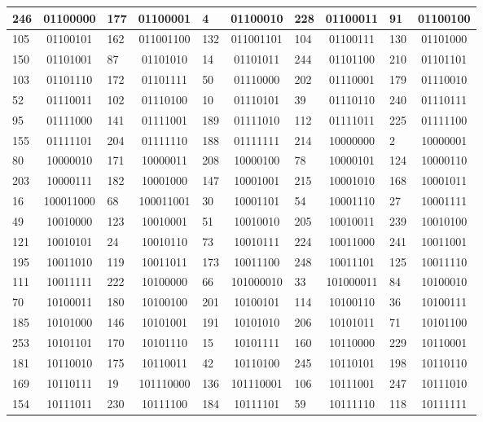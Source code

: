 \documentclass[conference,onecolumn,12pt]{IEEEtran}
\numberwithin{equation}{subsection}
\begin{document}
\begin{table}[h]
\begin{tabular}{l c l c l c l c l c}
246 & 01100000 & 177 & 01100001 & 4 & 01100010 & 228 & 01100011 & 91 & 01100100 \\ \hline
105 & 01100101 & 162 & 011001100 & 132 & 011001101 & 104 & 01100111 & 130 & 01101000 \\ \hline
150 & 01101001 & 87 & 01101010 & 14 & 01101011 & 244 & 01101100 & 210 & 01101101 \\ \hline
103 & 01101110 & 172 & 01101111 & 50 & 01110000 & 202 & 01110001 & 179 & 01110010 \\ \hline
52 & 01110011 & 102 & 01110100 & 10 & 01110101 & 39 & 01110110 & 240 & 01110111 \\ \hline
95 & 01111000 & 141 & 01111001 & 189 & 01111010 & 112 & 01111011 & 225 & 01111100 \\ \hline
155 & 01111101 & 204 & 01111110 & 188 & 01111111 & 214 & 10000000 & 2 & 10000001 \\ \hline
80 & 10000010 & 171 & 10000011 & 208 & 10000100 & 78 & 10000101 & 124 & 10000110 \\ \hline
203 & 10000111 & 182 & 10001000 & 147 & 10001001 & 215 & 10001010 & 168 & 10001011 \\ \hline
16 & 100011000 & 68 & 100011001 & 30 & 10001101 & 54 & 10001110 & 27 & 10001111 \\ \hline
49 & 10010000 & 123 & 10010001 & 51 & 10010010 & 205 & 10010011 & 239 & 10010100 \\ \hline
121 & 10010101 & 24 & 10010110 & 73 & 10010111 & 224 & 10011000 & 241 & 10011001 \\ \hline
195 & 10011010 & 119 & 10011011 & 173 & 10011100 & 248 & 10011101 & 125 & 10011110 \\ \hline
111 & 10011111 & 222 & 10100000 & 66 & 101000010 & 33 & 101000011 & 84 & 10100010 \\ \hline
70 & 10100011 & 180 & 10100100 & 201 & 10100101 & 114 & 10100110 & 36 & 10100111 \\ \hline
185 & 10101000 & 146 & 10101001 & 191 & 10101010 & 206 & 10101011 & 71 & 10101100 \\ \hline
253 & 10101101 & 170 & 10101110 & 15 & 10101111 & 160 & 10110000 & 229 & 10110001 \\ \hline
181 & 10110010 & 175 & 10110011 & 42 & 10110100 & 245 & 10110101 & 198 & 10110110 \\ \hline
169 & 10110111 & 19 & 101110000 & 136 & 101110001 & 106 & 10111001 & 247 & 10111010 \\ \hline
154 & 10111011 & 230 & 10111100 & 184 & 10111101 & 59 & 10111110 & 118 & 10111111 \\ \hline

\end{tabular}
\end{table}
\end{document}
